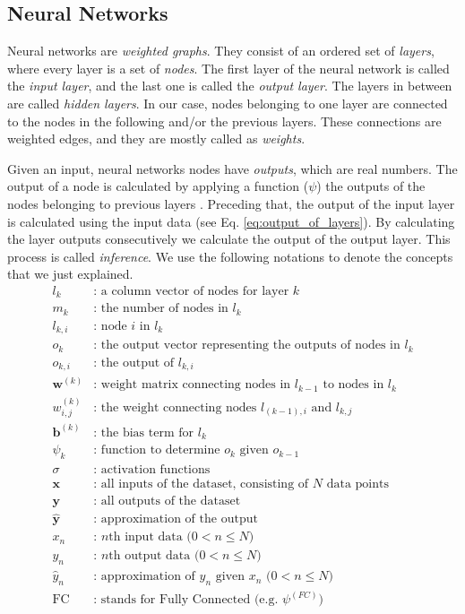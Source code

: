 \subsection{Neural Networks}
Neural networks are \textit{weighted graphs}. They consist of an ordered set of \textit{layers}, where every layer is a set of \textit{nodes}. The first layer of the neural network is called the \textit{input layer}, and the last one is called the \textit{output layer}. The layers in between are called \textit{hidden layers}. In our case, nodes belonging to one layer are connected to the nodes in the following and/or the previous layers. These connections are weighted edges, and they are mostly called as \textit{weights}. 

Given an input, neural networks nodes have \textit{outputs}, which are real numbers. The output of a node is calculated by applying a function ($\psi$) the outputs of the nodes belonging to previous layers . Preceding that, the output of the input layer is calculated using the input data (see Eq. \ref{eq:output_of_layers}).  By calculating the layer outputs consecutively we calculate the output of the output layer. This process is called \textit{inference}. We use the following notations to denote the concepts that we just explained.
\begin{equation}
\label{eq:variable_definitions}
\begin{split}
l_k & \text{: a column vector of nodes for layer $k$}\\
m_k & \text{: the number of nodes in $l_k$}\\
l_{k,i}  & \text{: node $i$ in $l_k$}\\
o_{k}  & \text{: the output vector representing the outputs of nodes in $l_{k}$}\\
o_{k,i}  & \text{: the output of $l_{k,i}$}\\
\mathbf{w}^{(k)}  & \text{: weight matrix connecting nodes in $l_{k-1}$ to nodes in $l_{k}$} \\
w^{(k)}_{i,j}  & \text{: the weight connecting nodes $l_{(k-1),i}$ and $l_{k,j}$} \\
\mathbf{b}^{(k)}  & \text{: the bias term for $l_{k}$} \\
\psi_k & \text{: function to determine $o_k$ given $o_{k-1}$}\\
\sigma & \text{: activation functions} \\
\mathbf{x} & \text{: all inputs of the dataset, consisting of $N$ data points} \\
\mathbf{y} & \text{: all outputs of the dataset} \\
\mathbf{\hat y} & \text{: approximation of the output}  \\
x_n & \text{: $n$th input data ($0 < n \leq N$)} \\
y_n & \text{: $n$th output data ($0 < n \leq N$)} \\
\hat y_n & \text{: approximation of $y_n$ given $x_n$ ($0 < n \leq N$)}\\
\text{FC} & \text{: stands for Fully Connected (e.g. $\psi^{(FC)}$)}
\end{split}
\end{equation}

